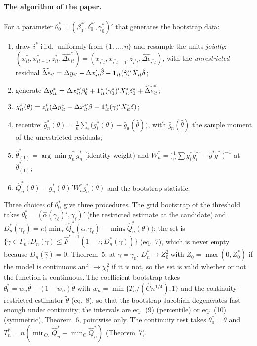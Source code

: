 \paragraph{The algorithm of the paper.} For a parameter $\theta^*_0=(\beta^{*\prime}_0,\delta^{*\prime}_0,\gamma^*_0)'$ that
generates the bootstrap data:
\begin{enumerate}
\item draw $i^*$ i.i.d.\ uniformly from $\{1,\dots,n\}$ and resample the units \emph{jointly}:
$(x^*_{it},x^*_{it-1},z^*_{it},\widehat{\Delta\epsilon}^*_{it})=(x_{i^*t},x_{i^*t-1},z_{i^*t},\widehat{\Delta\epsilon}_{i^*t})$,
with the \emph{unrestricted} residual $\widehat{\Delta\epsilon}_{it}=\Delta y_{it}-\Delta x_{it}'\hat\beta-\mathbf{1}_{it}(\hat\gamma)'X_{it}\hat\delta$;
\item generate $\Delta y^*_{it}=\Delta x^{*\prime}_{it}\beta^*_0+\mathbf{1}^*_{it}(\gamma^*_0)'X^*_{it}\delta^*_0+\widehat{\Delta\epsilon}^*_{it}$;
\item $g^*_{it}(\theta)=z^*_{it}(\Delta y^*_{it}-\Delta x^{*\prime}_{it}\beta-\mathbf{1}^*_{it}(\gamma)'X^*_{it}\delta)$;
\item recentre: $\bar g^*_n(\theta)=\frac1n\sum_i\bigl(g^*_i(\theta)-\bar g_n(\hat\theta)\bigr)$, with
$\bar g_n(\hat\theta)$ the sample moment of the unrestricted residuals;
\item $\hat\theta^*_{(1)}=\arg\min\bar g^{*\prime}_n\bar g^*_n$ (identity weight) and
$W^*_n=\bigl(\frac1n\sum g^*_ig^{*\prime}_i-\bar g^*\bar g^{*\prime}\bigr)^{-1}$ at $\hat\theta^*_{(1)}$;
\item $\hat Q^*_n(\theta)=\bar g^*_n(\theta)'W^*_n\bar g^*_n(\theta)$ and the bootstrap statistic.
\end{enumerate}
Three choices of $\theta^*_0$ give three procedures. The grid bootstrap of the threshold takes
$\theta^*_0=(\hat\alpha(\gamma_\ell)',\gamma_\ell)'$ (the restricted estimate at the candidate) and
$D^*_n(\gamma_\ell)=n\bigl(\min_\alpha\hat Q^*_n(\alpha,\gamma_\ell)-\min_\theta\hat Q^*_n(\theta)\bigr)$;
the set is $\{\gamma\in\Gamma_n:D_n(\gamma)\le\hat F^{*-1}(1-\tau;D^*_n(\gamma))\}$ (eq.~7), which is never empty because
$D_n(\hat\gamma)=0$. Theorem~5: at $\gamma=\gamma_0$, $D^*_n\to Z_0^2$ with $Z_0=\max(0,Z^*_0)$ if the model is continuous and
$\to\chi^2_1$ if it is not, so the set is valid whether or not the function is continuous. The coefficient
bootstrap takes $\theta^*_0=w_n\hat\theta+(1-w_n)\tilde\theta$ with $w_n=\min\{T_n/(\hat Cn^{1/4}),1\}$ and the
continuity-restricted estimator $\tilde\theta$ (eq.~8), so that the bootstrap Jacobian degenerates fast enough
under continuity; the intervals are eq.~(9) (percentile) or eq.~(10) (symmetric), Theorem~6, pointwise only. The continuity test
takes $\theta^*_0=\tilde\theta$ and $T^*_n=n(\min_{\Theta_c}\hat Q^*_n-\min_\Theta\hat Q^*_n)$ (Theorem~7).

